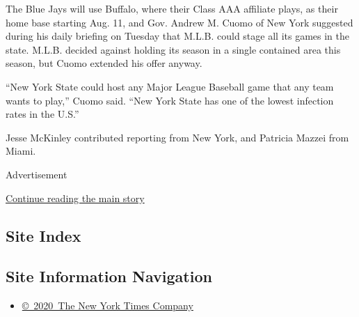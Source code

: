The Blue Jays will use Buffalo, where their Class AAA affiliate plays,
as their home base starting Aug. 11, and Gov. Andrew M. Cuomo of New
York suggested during his daily briefing on Tuesday that M.L.B. could
stage all its games in the state. M.L.B. decided against holding its
season in a single contained area this season, but Cuomo extended his
offer anyway.

``New York State could host any Major League Baseball game that any team
wants to play,'' Cuomo said. ``New York State has one of the lowest
infection rates in the U.S.''

Jesse McKinley contributed reporting from New York, and Patricia Mazzei
from Miami.

Advertisement

\protect\hyperlink{after-bottom}{Continue reading the main story}

\hypertarget{site-index}{%
\subsection{Site Index}\label{site-index}}

\hypertarget{site-information-navigation}{%
\subsection{Site Information
Navigation}\label{site-information-navigation}}

\begin{itemize}
\tightlist
\item
  \href{https://help.nytimes3xbfgragh.onion/hc/en-us/articles/115014792127-Copyright-notice}{©~2020~The
  New York Times Company}
\end{itemize}

